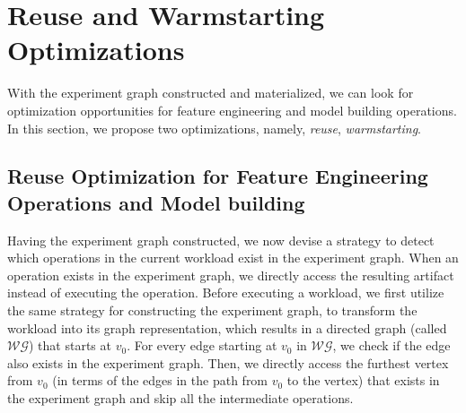 \section{Reuse and Warmstarting Optimizations}\label{sec-reuse-and-warmstarting}
With the experiment graph constructed and materialized, we can look for optimization opportunities for feature engineering and model building operations.
In this section, we propose two optimizations, namely, \textit{reuse}, \textit{warmstarting}.

\subsection{Reuse Optimization for Feature Engineering Operations and Model building}
Having the experiment graph constructed, we now devise a strategy to detect which operations in the current workload exist in the experiment graph.
When an operation exists in the experiment graph, we directly access the resulting artifact instead of executing the operation.
Before executing a workload, we first utilize the same strategy for constructing the experiment graph, to transform the workload into its graph representation, which results in a directed graph (called $\mathcal{WG}$) that starts at $v_0$.
For every edge starting at $v_0$ in $\mathcal{WG}$, we check if the edge also exists in the experiment graph.
Then, we directly access the furthest vertex from $v_0$ (in terms of the edges in the path from $v_0$ to the vertex) that exists in the experiment graph and skip all the intermediate operations.



